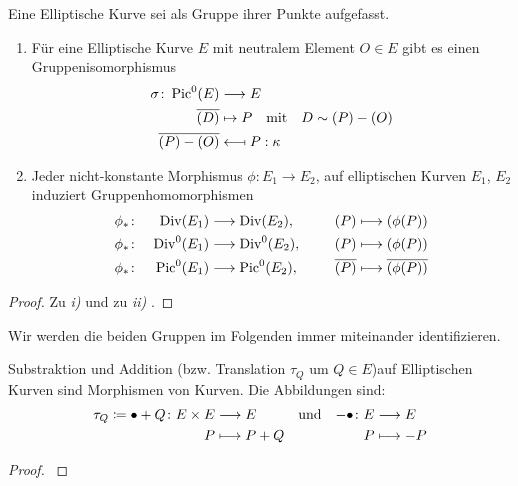 \begin{Satz}\label{gruppenaequivalenz}
  Eine Elliptische Kurve sei als Gruppe ihrer Punkte aufgefasst.
  \begin{enumerate}[label=\roman*)]
  \item 
    Für eine Elliptische Kurve $E$ mit neutralem Element $O\in E$ gibt
    es einen Gruppenisomorphismus
    \begin{align*}
      \sigma\colon \operatorname{Pic}^0(E) &\longrightarrow E\\
      \overline{(D)} &\mapsto P
                       \quad\text{mit}\quad D\sim (P)-(O)\\
      \overline{(P)-(O)} &\longmapsfrom P : \kappa
    \end{align*}

  \item
    Jeder nicht-konstante Morphismus $\phi\colon E_1\to E_2$, 
    auf elliptischen Kurven $E_1$, $E_2$ induziert Gruppenhomomorphismen
    \begin{alignat*}{3}
      &\phi_*\colon& \operatorname{Div}(E_1) 
      &\longrightarrow \operatorname{Div}(E_2),
      \qquad
      &(P) &\longmapsto (\phi(P))\\
      &\phi_*\colon& \operatorname{Div}^0(E_1) 
      &\longrightarrow \operatorname{Div}^0(E_2),
      &(P) &\longmapsto (\phi(P))\\
      &\phi_*\colon& \operatorname{Pic}^0(E_1) 
      &\longrightarrow \operatorname{Pic}^0(E_2),
      &\overline{(P)} &\longmapsto \overline{(\phi(P))}\\
    \end{alignat*}
  \end{enumerate}
  \begin{proof}
    Zu \emph{i)} \cite[siehe][Proposition III.3.4]{silverman} und
    zu \emph{ii)} \cite[siehe][Remark II.3.7]{silverman}.
    \end{proof}
  \end{Satz}
  Wir werden die beiden Gruppen im Folgenden immer miteinander
  identifizieren.


  \begin{Satz}\label{additionmorphismus}
    Substraktion und Addition (bzw. Translation $\tau_Q$ um $Q\in E$)auf
    Elliptischen Kurven sind Morphismen von Kurven. Die Abbildungen sind:
    \begin{align*}
      \tau_Q\coloneqq\bullet+Q\colon E\times E&\longrightarrow E  
      &&\text{und}  
      &-\bullet\colon E&\longrightarrow E \\
      P&\longmapsto P+Q             
      &&&P&\longmapsto -P
    \end{align*}
    \begin{proof}
      \cite[siehe][Theorem III.3.6]{silverman}
    \end{proof}
  \end{Satz}

